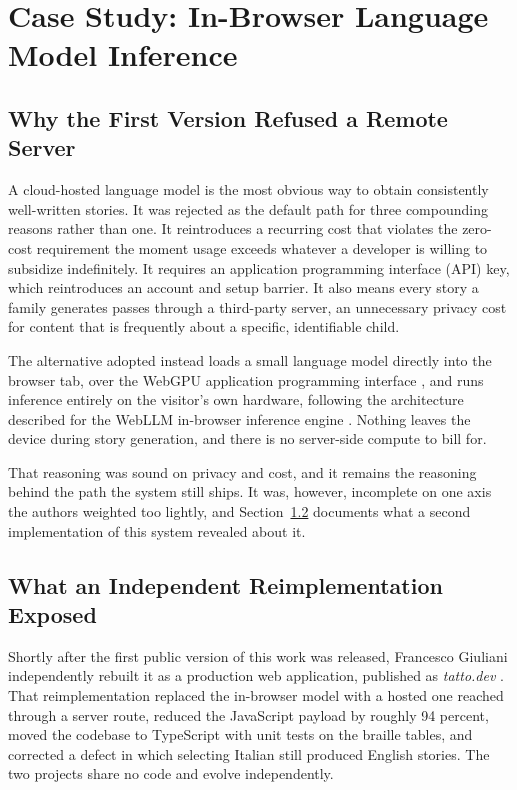 \documentclass[conference]{IEEEtran}
\begin{document}
\section{Case Study: In-Browser Language Model Inference}\label{sec:llm}

\subsection{Why the First Version Refused a Remote Server}

A cloud-hosted language model is the most obvious way to obtain consistently well-written stories. It was rejected as the default path for three compounding reasons rather than one. It reintroduces a recurring cost that violates the zero-cost requirement the moment usage exceeds whatever a developer is willing to subsidize indefinitely. It requires an application programming interface (API) key, which reintroduces an account and setup barrier. It also means every story a family generates passes through a third-party server, an unnecessary privacy cost for content that is frequently about a specific, identifiable child.

The alternative adopted instead loads a small language model directly into the browser tab, over the WebGPU application programming interface \cite{w3cwebgpu}, and runs inference entirely on the visitor's own hardware, following the architecture described for the WebLLM in-browser inference engine \cite{webllm}. Nothing leaves the device during story generation, and there is no server-side compute to bill for.

That reasoning was sound on privacy and cost, and it remains the reasoning behind the path the system still ships. It was, however, incomplete on one axis the authors weighted too lightly, and Section~\ref{sec:hosted} documents what a second implementation of this system revealed about it.

\subsection{What an Independent Reimplementation Exposed}\label{sec:hosted}

Shortly after the first public version of this work was released, Francesco Giuliani independently rebuilt it as a production web application, published as \emph{tatto.dev} \cite{tattodev}. That reimplementation replaced the in-browser model with a hosted one reached through a server route, reduced the JavaScript payload by roughly 94 percent, moved the codebase to TypeScript with unit tests on the braille tables, and corrected a defect in which selecting Italian still produced English stories. The two projects share no code and evolve independently.
\end{document}
